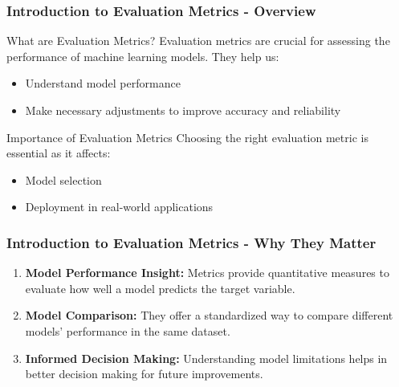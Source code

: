 \documentclass[aspectratio=169]{beamer}
\begin{document}
\begin{frame}[fragile]
    \frametitle{Introduction to Evaluation Metrics - Overview}
    \begin{block}{What are Evaluation Metrics?}
        Evaluation metrics are crucial for assessing the performance of machine learning models. They help us:
        \begin{itemize}
            \item Understand model performance
            \item Make necessary adjustments to improve accuracy and reliability
        \end{itemize}
    \end{block}
    \begin{block}{Importance of Evaluation Metrics}
        Choosing the right evaluation metric is essential as it affects:
        \begin{itemize}
            \item Model selection
            \item Deployment in real-world applications
        \end{itemize}
    \end{block}
\end{frame}

\begin{frame}[fragile]
    \frametitle{Introduction to Evaluation Metrics - Why They Matter}
    \begin{enumerate}
        \item \textbf{Model Performance Insight:} 
            Metrics provide quantitative measures to evaluate how well a model predicts the target variable.
            
        \item \textbf{Model Comparison:}
            They offer a standardized way to compare different models' performance in the same dataset.
            
        \item \textbf{Informed Decision Making:}
            Understanding model limitations helps in better decision making for future improvements.
    \end{enumerate}
\end{frame}
\end{document}
